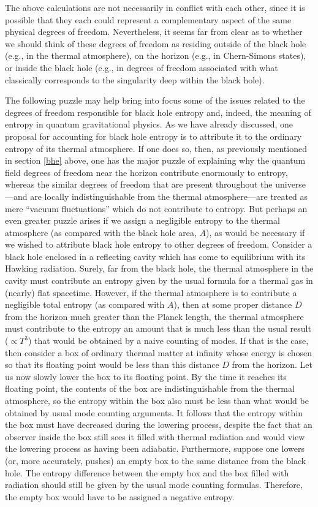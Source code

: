 The above calculations are not necessarily in conflict with each
other, since it is possible that they each could represent a
complementary aspect of the same physical degrees of freedom.
Nevertheless, it seems far from clear as to whether we should think of
these degrees of freedom as residing outside of the black hole (e.g.,
in the thermal atmosphere), on the horizon (e.g., in Chern-Simons
states), or inside the black hole (e.g., in degrees of freedom
associated with what classically corresponds to the singularity deep
within the black hole). 

The following puzzle \cite{w8} may help bring into focus some of the
issues related to the degrees of freedom responsible for black hole
entropy and, indeed, the meaning of entropy in quantum gravitational
physics. As we have already discussed, one proposal for accounting for
black hole entropy is to attribute it to the ordinary entropy of its
thermal atmosphere. If one does so, then, as previously mentioned in
section \ref{bhe} above, one has the major puzzle of explaining why
the quantum field degrees of freedom near the horizon contribute
enormously to entropy, whereas the similar degrees of freedom that are
present throughout the universe---and are locally indistinguishable
from the thermal atmosphere---are treated as mere ``vacuum
fluctuations'' which do not contribute to entropy. But perhaps an even
greater puzzle arises if we assign a negligible entropy to the thermal
atmosphere (as compared with the black hole area, $A$), as would be
necessary if we wished to attribute black hole entropy to other
degrees of freedom.  Consider a black hole enclosed in a reflecting
cavity which has come to equilibrium with its Hawking
radiation. Surely, far from the black hole, the thermal atmosphere in
the cavity must contribute an entropy given by the usual formula for a
thermal gas in (nearly) flat spacetime. However, if the thermal
atmosphere is to contribute a negligible total entropy (as compared
with $A$), then at some proper distance $D$ from the horizon much
greater than the Planck length, the thermal atmosphere must contribute
to the entropy an amount that is much less than the usual result
($\propto T^3$) that would be obtained by a naive counting of
modes. If that is the case, then consider a box of ordinary thermal
matter at infinity whose energy is chosen so that its floating point
would be less than this distance $D$ from the horizon.  Let us now
slowly lower the box to its floating point. By the time it reaches its
floating point, the contents of the box are indistinguishable from the
thermal atmosphere, so the entropy within the box also must be less
than what would be obtained by usual mode counting arguments. It
follows that the entropy within the box must have decreased during the
lowering process, despite the fact that an observer inside the box
still sees it filled with thermal radiation and would view the
lowering process as having been adiabatic. Furthermore, suppose one
lowers (or, more accurately, pushes) an empty box to the same distance
from the black hole. The entropy difference between the empty box and
the box filled with radiation should still be given by the usual mode
counting formulas. Therefore, the empty box would have to be assigned
a negative entropy.

